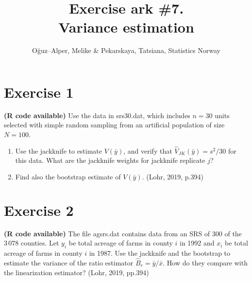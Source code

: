 \documentclass[12pt]{article}
\begin{document}
\title{Exercise ark \#7.\\ Variance estimation}
\author{O\u{g}uz--Alper, Melike \& Pekarskaya, Tatsiana, Statistics Norway}
\maketitle

\section*{Exercise 1}
\textbf{\color{ForestGreen}(R code available)} Use the data in srs30.dat, which includes $n=30$ units selected with simple random sampling from an artificial population of size $N=100$. 
\begin{enumerate}
\item Use the jackknife to estimate $V(\bar{y})$, and verify that $\hat{V}_{JK}(\bar{y})=s^2/30$ for this data. What are the jackknife weights for jackknife replicate $j$? 
\item Find also the bootstrap estimate of $V(\bar{y})$. \hfill(Lohr, 2019, p.394)
\end{enumerate}

\section*{Exercise 2}
\textbf{\color{ForestGreen}(R code available)} The file agsrs.dat contains data from an SRS of $300$ of the $3\,078$ counties.
Let $y_i$ be total acreage of farms in county $i$ in 1992 and $x_i$ be total acreage of farms in county $i$ in 1987. Use the jackknife and the bootstrap to estimate the variance of the ratio estimator $\hat{B}_r=\bar{y}/\bar{x}$. How do they compare with the linearization estimator? \hfill(Lohr, 2019, pp.394)
\end{document}
